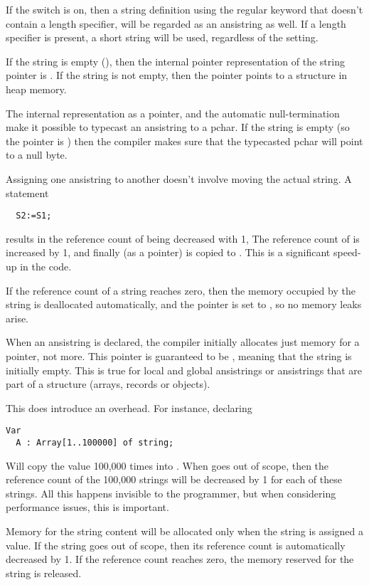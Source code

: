 If the  switch is on, then a string definition using the
regular  keyword that doesn't contain a length specifier, 
will be regarded as an ansistring as well. If a length specifier is present,
a short string will be used, regardless of the  setting.

If the string is empty (), then the internal pointer representation
of the string pointer is . If the string is not empty, then the 
pointer points to a structure in heap memory.

The internal representation as a pointer, and the automatic null-termination
make it possible to typecast an ansistring to a pchar. If the string is empty 
(so the pointer is ) then the compiler makes sure that the typecasted 
pchar will point to a null byte.

Assigning one ansistring to another doesn't involve moving the actual
string. A statement
\begin{verbatim}
  S2:=S1;
\end{verbatim}
results in the reference count of  being decreased with 1,
The reference count of  is increased by 1, and finally 
(as a pointer) is copied to . This is a significant speed-up in
the code.

If the reference count of a string reaches zero, then the memory occupied 
by the string is deallocated automatically, and the pointer is set to
, so no memory leaks arise.

When an ansistring is declared, the \fpc compiler initially
allocates just memory for a pointer, not more. This pointer is guaranteed
to be , meaning that the string is initially empty. This is
true for local and global ansistrings or ansistrings that are part of a 
structure (arrays, records or objects).

This does introduce an overhead. For instance, declaring
\begin{verbatim}
Var
  A : Array[1..100000] of string;
\end{verbatim}
Will copy the value  100,000 times into . 
When  goes out of scope, then the reference 
count of the 100,000 strings will be decreased by 1 for each
of these strings. All this happens invisible to the programmer, 
but when considering performance issues, this is important.

Memory for the string content will be allocated only when the string is 
assigned a value. If the string goes out of scope, then its reference 
count is automatically  decreased by 1. If the reference count reaches 
zero, the memory reserved for the string is released.

